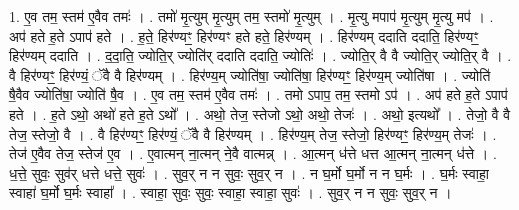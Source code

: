 \documentclass[17pt]{extarticle}
\begin{document}
1. ए॒व तम॒ स्तम॑ ए॒वैव तमः॑ । . तमो॑ मृ॒त्युम् मृ॒त्युम् तम॒ स्तमो॑ मृ॒त्युम् । . मृ॒त्यु मपाप॑ मृ॒त्युम् मृ॒त्यु मप॑ । . अप॑ हते ह॒ते ऽपाप॑ हते । . ह॒ते॒ हिर॑ण्यꣳ॒॒ हिर॑ण्यꣳ हते हते॒ हिर॑ण्यम् । . हिर॑ण्यम् ददाति ददाति॒ हिर॑ण्यꣳ॒॒ हिर॑ण्यम् ददाति । . द॒दा॒ति॒ ज्योति॒र् ज्योति॑र् ददाति ददाति॒ ज्योतिः॑ । . ज्योति॒र् वै वै ज्योति॒र् ज्योति॒र् वै । . वै हिर॑ण्यꣳ॒॒ हिर॑ण्यं॒ ॅवै वै हिर॑ण्यम् । . हिर॑ण्य॒म् ज्योति॑षा॒ ज्योति॑षा॒ हिर॑ण्यꣳ॒॒ हिर॑ण्य॒म् ज्योति॑षा । . ज्योति॑ षै॒वैव ज्योति॑षा॒ ज्योति॑ षै॒व । . ए॒व तम॒ स्तम॑ ए॒वैव तमः॑ । . तमो ऽपाप॒ तम॒ स्तमो ऽप॑ । . अप॑ हते ह॒ते ऽपाप॑ हते । . ह॒ते ऽथो॒ अथो॑ हते ह॒ते ऽथो᳚ । . अथो॒ तेज॒ स्तेजो ऽथो॒ अथो॒ तेजः॑ । . अथो॒ इत्यथो᳚ । . तेजो॒ वै वै तेज॒ स्तेजो॒ वै । . वै हिर॑ण्यꣳ॒॒ हिर॑ण्यं॒ ॅवै वै हिर॑ण्यम् । . हिर॑ण्य॒म् तेज॒ स्तेजो॒ हिर॑ण्यꣳ॒॒ हिर॑ण्य॒म् तेजः॑ । . तेज॑ ए॒वैव तेज॒ स्तेज॑ ए॒व । . ए॒वात्मन् ना॒त्मन् ने॒वै वात्मन्न् । . आ॒त्मन् ध॑त्ते धत्त आ॒त्मन् ना॒त्मन् ध॑त्ते । . ध॒त्ते॒ सुवः॒ सुव॑र् धत्ते धत्ते॒ सुवः॑ । . सुव॒र् न न सुवः॒ सुव॒र् न । . न घ॒र्मो घ॒र्मो न न घ॒र्मः । . घ॒र्मः स्वाहा॒ स्वाहा॑ घ॒र्मो घ॒र्मः स्वाहा᳚ । . स्वाहा॒ सुवः॒ सुवः॒ स्वाहा॒ स्वाहा॒ सुवः॑ । . सुव॒र् न न सुवः॒ सुव॒र् न । \newline
\end{document}

